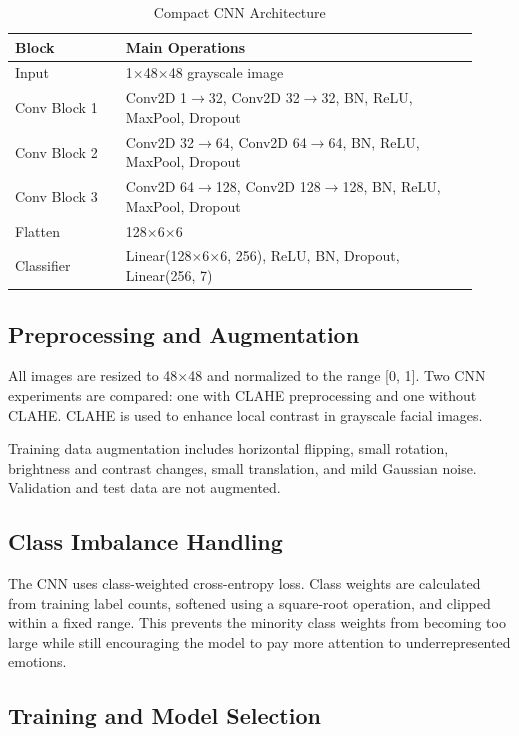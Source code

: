 \documentclass[conference]{IEEEtran}
\begin{document}
\begin{table}[t]
\centering
\caption{Compact CNN Architecture}
\label{tab:cnn_architecture}
\scriptsize
\begin{tabular}{@{}p{0.22\linewidth}p{0.70\linewidth}@{}}
\toprule
Block & Main Operations \\
\midrule
Input & 1$\times$48$\times$48 grayscale image \\
Conv Block 1 & Conv2D 1$\rightarrow$32, Conv2D 32$\rightarrow$32, BN, ReLU, MaxPool, Dropout \\
Conv Block 2 & Conv2D 32$\rightarrow$64, Conv2D 64$\rightarrow$64, BN, ReLU, MaxPool, Dropout \\
Conv Block 3 & Conv2D 64$\rightarrow$128, Conv2D 128$\rightarrow$128, BN, ReLU, MaxPool, Dropout \\
Flatten & 128$\times$6$\times$6 \\
Classifier & Linear(128$\times$6$\times$6, 256), ReLU, BN, Dropout, Linear(256, 7) \\
\bottomrule
\end{tabular}
\end{table}

\subsection{Preprocessing and Augmentation}

All images are resized to 48$\times$48 and normalized to the range [0, 1].
Two CNN experiments are compared: one with CLAHE preprocessing and one without
CLAHE. CLAHE is used to enhance local contrast in grayscale facial images.

Training data augmentation includes horizontal flipping, small rotation,
brightness and contrast changes, small translation, and mild Gaussian noise.
Validation and test data are not augmented.

\subsection{Class Imbalance Handling}

The CNN uses class-weighted cross-entropy loss. Class weights are calculated
from training label counts, softened using a square-root operation, and clipped
within a fixed range. This prevents the minority class weights from becoming
too large while still encouraging the model to pay more attention to
underrepresented emotions.

\subsection{Training and Model Selection}
\end{document}

